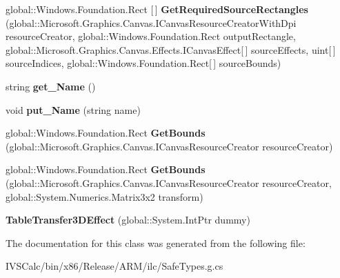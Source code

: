 \begin{DoxyCompactItemize}
global\+::\+Windows.\+Foundation.\+Rect \mbox{[}$\,$\mbox{]} {\bfseries Get\+Required\+Source\+Rectangles} (global\+::\+Microsoft.\+Graphics.\+Canvas.\+I\+Canvas\+Resource\+Creator\+With\+Dpi resource\+Creator, global\+::\+Windows.\+Foundation.\+Rect output\+Rectangle, global\+::\+Microsoft.\+Graphics.\+Canvas.\+Effects.\+I\+Canvas\+Effect\mbox{[}$\,$\mbox{]} source\+Effects, uint\mbox{[}$\,$\mbox{]} source\+Indices, global\+::\+Windows.\+Foundation.\+Rect\mbox{[}$\,$\mbox{]} source\+Bounds)
\item 
\mbox{\label{class_microsoft_1_1_graphics_1_1_canvas_1_1_effects_1_1_table_transfer3_d_effect_a5fc7cb9a5bf71f88ad31f919033b0f00}} 
string {\bfseries get\+\_\+\+Name} ()
\item 
\mbox{\label{class_microsoft_1_1_graphics_1_1_canvas_1_1_effects_1_1_table_transfer3_d_effect_a0352b2dcc61f7ab281f41815ebaa9930}} 
void {\bfseries put\+\_\+\+Name} (string name)
\item 
\mbox{\label{class_microsoft_1_1_graphics_1_1_canvas_1_1_effects_1_1_table_transfer3_d_effect_af2b350f1269e83b795233803c6f61283}} 
global\+::\+Windows.\+Foundation.\+Rect {\bfseries Get\+Bounds} (global\+::\+Microsoft.\+Graphics.\+Canvas.\+I\+Canvas\+Resource\+Creator resource\+Creator)
\item 
\mbox{\label{class_microsoft_1_1_graphics_1_1_canvas_1_1_effects_1_1_table_transfer3_d_effect_af079ef57539db85abe983a0d4859ce4d}} 
global\+::\+Windows.\+Foundation.\+Rect {\bfseries Get\+Bounds} (global\+::\+Microsoft.\+Graphics.\+Canvas.\+I\+Canvas\+Resource\+Creator resource\+Creator, global\+::\+System.\+Numerics.\+Matrix3x2 transform)
\item 
\mbox{\label{class_microsoft_1_1_graphics_1_1_canvas_1_1_effects_1_1_table_transfer3_d_effect_af9a5033370f8687d7d67be5b377d59e5}} 
{\bfseries Table\+Transfer3\+D\+Effect} (global\+::\+System.\+Int\+Ptr dummy)
\end{DoxyCompactItemize}


The documentation for this class was generated from the following file\+:\begin{DoxyCompactItemize}
\item 
I\+V\+S\+Calc/bin/x86/\+Release/\+A\+R\+M/ilc/Safe\+Types.\+g.\+cs\end{DoxyCompactItemize}
